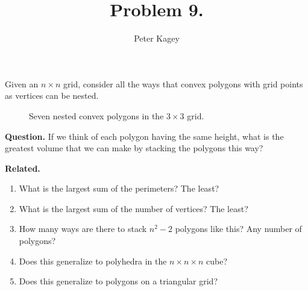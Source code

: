 \documentclass{article}
\newenvironment{question}{\begin{trivlist}\item[\textbf{Question.}]}{\end{trivlist}}
\newenvironment{related}{\begin{trivlist}\item[\textbf{Related.}]\end{trivlist}\begin{enumerate}}{\end{enumerate}}
\begin{document}
\title{Problem 9.}
\date{}
\author{Peter Kagey}
\maketitle
  Given an $n \times n$ grid, consider all the ways that convex polygons
  with grid points as vertices can be nested.
\begin{figure}[!h]
  \centering
  \caption{Seven nested convex polygons in the $3 \times 3$ grid.}
\end{figure}

\begin{question}
  If we think of each polygon having the same height, what is the greatest
  volume that we can make by stacking the polygons this way?
\end{question}

\begin{related}
  \item What is the largest sum of the perimeters? The least?
  \item What is the largest sum of the number of vertices? The least?
  \item How many ways are there to stack $n^2 - 2$ polygons like this?
    Any number of polygons?
  \item Does this generalize to polyhedra in the $n \times n \times n$ cube?
  \item Does this generalize to polygons on a triangular grid?
\end{related}
\end{document}
